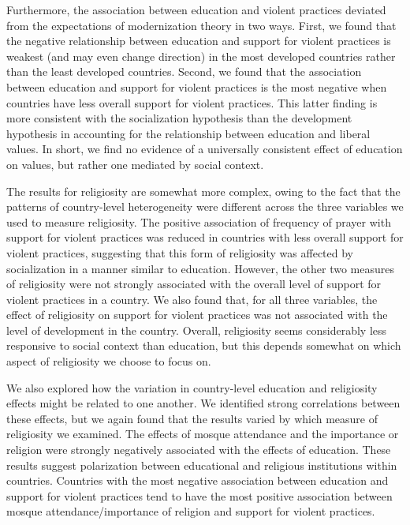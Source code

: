 \documentclass[10pt,letterpaper]{article}
\begin{document}
Furthermore, the association between education and violent practices deviated from the expectations of modernization theory in two ways. First, we found that the negative relationship between education and support for violent practices is weakest (and may even change direction) in the most developed countries rather than the least developed countries. Second, we found that the association between education and support for violent practices is the most negative when countries have less overall support for violent practices. This latter finding is more consistent with the socialization hypothesis than the development hypothesis in accounting for the relationship between education and liberal values. In short, we find no evidence of a universally consistent effect of education on values, but rather one mediated by social context.

The results for religiosity are somewhat more complex, owing to the fact that the patterns of country-level heterogeneity were different across the three variables we used to measure religiosity. The positive association of frequency of prayer with support for violent practices was reduced in countries with less overall support for violent practices, suggesting that this form of religiosity was affected by socialization in a manner similar to education. However, the other two measures of religiosity were not strongly associated with the overall level of support for violent practices in a country. We also found that, for all three variables, the effect of religiosity on support for violent practices was not associated with the level of development in the country. Overall, religiosity seems considerably less responsive to social context than education, but this depends somewhat on which aspect of religiosity we choose to focus on.

We also explored how the variation in country-level education and religiosity effects might be related to one another. We identified strong correlations between these effects, but we again found that the results varied by which measure of religiosity we examined. The effects of mosque attendance and the importance or religion were strongly negatively associated with the effects of education. These results suggest polarization between educational and religious institutions within countries. Countries with the most negative association between education and support for violent practices tend to have the most positive association between mosque attendance/importance of religion and support for violent practices.
\end{document}
